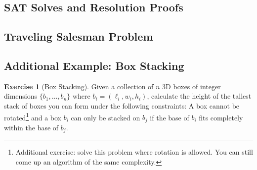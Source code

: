\documentclass[10pt]{article}
\theoremstyle{plain}
\theoremstyle{definition}
\newtheorem{exer}[thm]{Exercise}
\numberwithin{equation}{section}
\numberwithin{figure}{section}
\begin{document}
\subsection{SAT Solves and Resolution Proofs}

\subsection{Traveling Salesman Problem}

\subsection{Additional Example: Box Stacking}

\begin{exer}[Box Stacking] Given a collection of $n$ 3D boxes of integer dimensions $\{b_1, \ldots, b_n\}$ where $b_i = (\ell_i, w_i, h_i)$, calculate the height of the tallest stack of boxes you can form under the following constraints: A box cannot be rotated\footnote{Additional exercise: solve this problem where rotation is allowed. You can still come up an algorithm of the same complexity.} and a box $b_i$ can only be stacked on $b_j$ if the base of $b_i$ fits completely within the base of $b_j$.
\end{exer}
\end{document}

